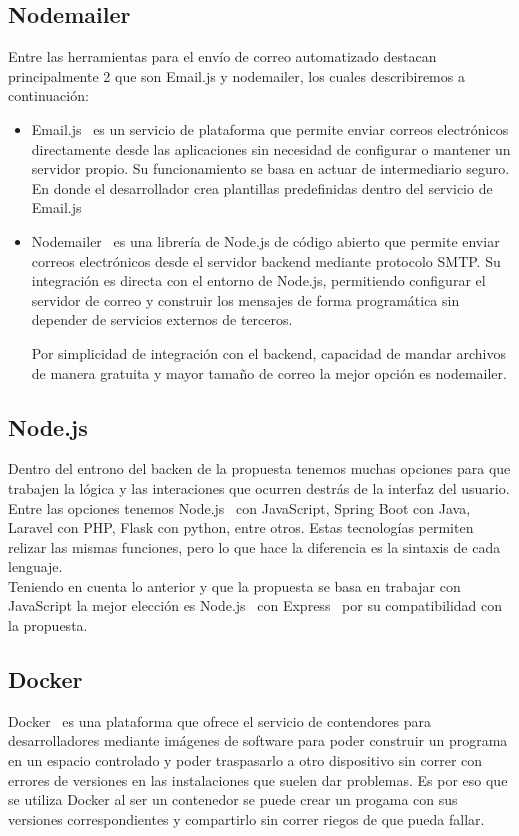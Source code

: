 ﻿\documentclass{iccmemoria}
\begin{document}
\subsection{Nodemailer}
Entre las herramientas para el envío de correo automatizado destacan principalmente 2 que son Email.js y nodemailer, los cuales describiremos a continuación:
\begin{itemize}
    \item Email.js~\cite{emailjs} es un servicio de plataforma que permite enviar correos electrónicos directamente desde las aplicaciones sin necesidad de configurar o mantener un servidor propio. Su funcionamiento se basa en actuar de intermediario seguro. En donde el desarrollador crea plantillas predefinidas dentro del servicio de Email.js

    \item Nodemailer~\cite{nodemailer} es una librería de Node.js de código abierto que permite enviar correos electrónicos desde el servidor backend mediante protocolo SMTP. Su integración es directa con el entorno de Node.js, permitiendo configurar el servidor de correo y construir los mensajes de forma programática sin depender de servicios externos de terceros.

    Por simplicidad de integración con el backend, capacidad de mandar archivos de manera gratuita y mayor tamaño de correo la mejor opción es nodemailer.
    
\end{itemize}

\subsection{Node.js}
Dentro del entrono del backen de la propuesta tenemos muchas opciones para que trabajen la lógica y las interaciones que ocurren destrás de la interfaz del usuario. Entre las opciones tenemos Node.js~\cite{nodejs} con JavaScript, Spring Boot con Java, Laravel con PHP, Flask con python, entre otros. Estas tecnologías permiten relizar las mismas funciones, pero lo que hace la diferencia es la sintaxis de cada lenguaje.\\
Teniendo en cuenta lo anterior y que la propuesta se basa en trabajar con JavaScript la mejor elección es Node.js~\cite{nodejs} con Express~\cite{express} por su compatibilidad con la propuesta.

\subsection{Docker}
Docker~\cite{docker} es una plataforma que ofrece el servicio de contendores para desarrolladores mediante imágenes de software para poder construir un programa en un espacio controlado y poder traspasarlo a otro dispositivo sin correr con errores de versiones en las instalaciones que suelen dar problemas. Es por eso que se utiliza Docker al ser un contenedor se puede crear un progama con sus versiones correspondientes y compartirlo sin correr riegos de que pueda fallar.
\end{document}
